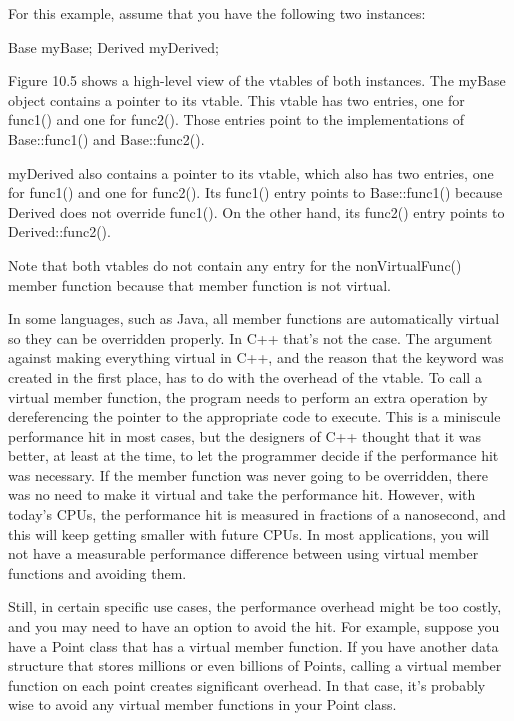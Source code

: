 For this example, assume that you have the following two instances:

\begin{cpp}
Base myBase;
Derived myDerived;
\end{cpp}

Figure 10.5 shows a high-level view of the vtables of both instances. The myBase object contains a pointer to its vtable. This vtable has two entries, one for func1() and one for func2(). Those entries point to the implementations of Base::func1() and Base::func2().


myDerived also contains a pointer to its vtable, which also has two entries, one for func1() and one for func2(). Its func1() entry points to Base::func1() because Derived does not override func1(). On the other hand, its func2() entry points to Derived::func2().

Note that both vtables do not contain any entry for the nonVirtualFunc() member function because that member function is not virtual.


In some languages, such as Java, all member functions are automatically virtual so they can be overridden properly. In C++ that’s not the case. The argument against making everything virtual in C++, and the reason that the keyword was created in the first place, has to do with the overhead of the vtable. To call a virtual member function, the program needs to perform an extra operation by dereferencing the pointer to the appropriate code to execute. This is a miniscule performance hit in most cases, but the designers of C++ thought that it was better, at least at the time, to let the programmer decide if the performance hit was necessary. If the member function was never going to be overridden, there was no need to make it virtual and take the performance hit. However, with today’s CPUs, the performance hit is measured in fractions of a nanosecond, and this will keep getting smaller with future CPUs. In most applications, you will not have a measurable performance difference between using virtual member functions and avoiding them.

Still, in certain specific use cases, the performance overhead might be too costly, and you may need to have an option to avoid the hit. For example, suppose you have a Point class that has a virtual member function. If you have another data structure that stores millions or even billions of Points, calling a virtual member function on each point creates significant overhead. In that case, it’s probably wise to avoid any virtual member functions in your Point class.

